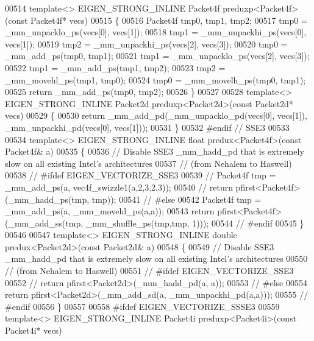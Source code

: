 \begin{DoxyCode}
00514 \textcolor{keyword}{template}<> EIGEN\_STRONG\_INLINE Packet4f preduxp<Packet4f>(\textcolor{keyword}{const} Packet4f* vecs)
00515 \{
00516   Packet4f tmp0, tmp1, tmp2;
00517   tmp0 = \_mm\_unpacklo\_ps(vecs[0], vecs[1]);
00518   tmp1 = \_mm\_unpackhi\_ps(vecs[0], vecs[1]);
00519   tmp2 = \_mm\_unpackhi\_ps(vecs[2], vecs[3]);
00520   tmp0 = \_mm\_add\_ps(tmp0, tmp1);
00521   tmp1 = \_mm\_unpacklo\_ps(vecs[2], vecs[3]);
00522   tmp1 = \_mm\_add\_ps(tmp1, tmp2);
00523   tmp2 = \_mm\_movehl\_ps(tmp1, tmp0);
00524   tmp0 = \_mm\_movelh\_ps(tmp0, tmp1);
00525   \textcolor{keywordflow}{return} \_mm\_add\_ps(tmp0, tmp2);
00526 \}
00527 
00528 \textcolor{keyword}{template}<> EIGEN\_STRONG\_INLINE Packet2d preduxp<Packet2d>(\textcolor{keyword}{const} Packet2d* vecs)
00529 \{
00530   \textcolor{keywordflow}{return} \_mm\_add\_pd(\_mm\_unpacklo\_pd(vecs[0], vecs[1]), \_mm\_unpackhi\_pd(vecs[0], vecs[1]));
00531 \}
00532 \textcolor{preprocessor}{#endif  // SSE3}
00533 
00534 \textcolor{keyword}{template}<> EIGEN\_STRONG\_INLINE \textcolor{keywordtype}{float} predux<Packet4f>(\textcolor{keyword}{const} Packet4f& a)
00535 \{
00536   \textcolor{comment}{// Disable SSE3 \_mm\_hadd\_pd that is extremely slow on all existing Intel's architectures}
00537   \textcolor{comment}{// (from Nehalem to Haswell)}
00538 \textcolor{comment}{// #ifdef EIGEN\_VECTORIZE\_SSE3}
00539 \textcolor{comment}{//   Packet4f tmp = \_mm\_add\_ps(a, vec4f\_swizzle1(a,2,3,2,3));}
00540 \textcolor{comment}{//   return pfirst<Packet4f>(\_mm\_hadd\_ps(tmp, tmp));}
00541 \textcolor{comment}{// #else}
00542   Packet4f tmp = \_mm\_add\_ps(a, \_mm\_movehl\_ps(a,a));
00543   \textcolor{keywordflow}{return} pfirst<Packet4f>(\_mm\_add\_ss(tmp, \_mm\_shuffle\_ps(tmp,tmp, 1)));
00544 \textcolor{comment}{// #endif}
00545 \}
00546 
00547 \textcolor{keyword}{template}<> EIGEN\_STRONG\_INLINE \textcolor{keywordtype}{double} predux<Packet2d>(\textcolor{keyword}{const} Packet2d& a)
00548 \{
00549   \textcolor{comment}{// Disable SSE3 \_mm\_hadd\_pd that is extremely slow on all existing Intel's architectures}
00550   \textcolor{comment}{// (from Nehalem to Haswell)}
00551 \textcolor{comment}{// #ifdef EIGEN\_VECTORIZE\_SSE3}
00552 \textcolor{comment}{//   return pfirst<Packet2d>(\_mm\_hadd\_pd(a, a));}
00553 \textcolor{comment}{// #else}
00554   \textcolor{keywordflow}{return} pfirst<Packet2d>(\_mm\_add\_sd(a, \_mm\_unpackhi\_pd(a,a)));
00555 \textcolor{comment}{// #endif}
00556 \}
00557 
00558 \textcolor{preprocessor}{#ifdef EIGEN\_VECTORIZE\_SSSE3}
00559 \textcolor{keyword}{template}<> EIGEN\_STRONG\_INLINE Packet4i preduxp<Packet4i>(\textcolor{keyword}{const} Packet4i* vecs)

\end{DoxyCode}
